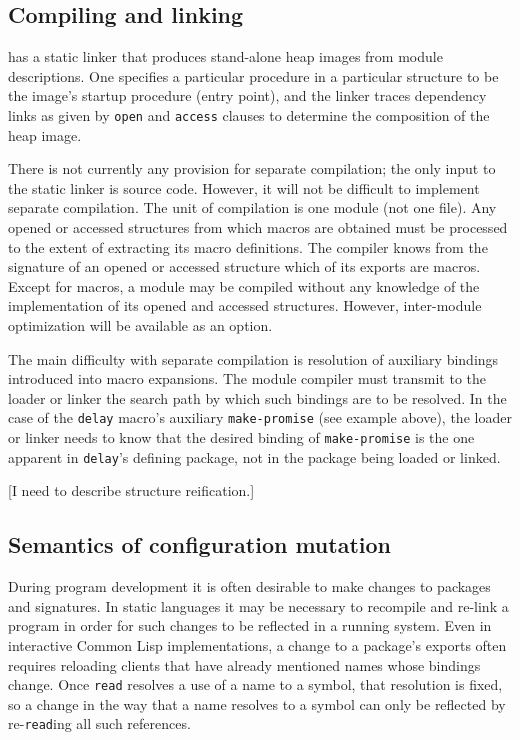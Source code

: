 \subsection*{Compiling and linking}

\hack{} has a static linker that produces stand-alone heap images
from module descriptions.  One specifies a particular procedure in a
particular structure to be the image's startup procedure (entry
point), and the linker traces dependency links as given by {\tt open}
and {\tt access} clauses to determine the composition of the heap
image.

There is not currently any provision for separate compilation; the
only input to the static linker is source code.  However, it will not
be difficult to implement separate compilation.  The unit of
compilation is one module (not one file).  Any opened or accessed
structures from which macros are obtained must be processed to the
extent of extracting its macro definitions.  The compiler knows from
the signature of an opened or accessed structure which of its exports
are macros.  Except for macros, a module may be compiled without any
knowledge of the implementation of its opened and accessed structures.
However, inter-module optimization will be available as an option.

The main difficulty with separate compilation is resolution of
auxiliary bindings introduced into macro expansions.  The module
compiler must transmit to the loader or linker the search path by
which such bindings are to be resolved.  In the case of the {\tt delay}
macro's auxiliary {\tt make-promise} (see example above), the loader
or linker needs to know that the desired binding of {\tt make-promise}
is the one apparent in {\tt delay}'s defining package, not in the
package being loaded or linked.

[I need to describe structure reification.]


\subsection*{Semantics of configuration mutation}

During program development it is often desirable to make changes to
packages and signatures.  In static languages it may be necessary to
recompile and re-link a program in order for such changes to be
reflected in a running system.  Even in interactive Common Lisp
implementations, a change to a package's exports often requires
reloading clients that have already mentioned names whose bindings
change.  Once {\tt read} resolves a use of a name to a symbol, that
resolution is fixed, so a change in the way that a name resolves to a
symbol can only be reflected by re-{\tt read}ing all such references.

